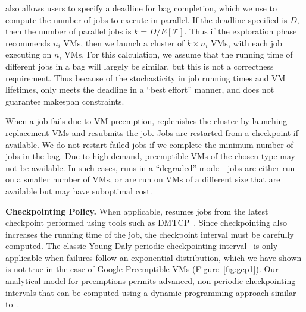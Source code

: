 \sysname also allows users to specify a deadline for bag completion, which we use to compute the number of jobs to execute in parallel.
If the deadline specified is $D$, then the number of parallel jobs is $k=D/E[\mathcal{T}]$.
Thus if the exploration phase recommends $n_i$ VMs, then we launch a cluster of $k\times n_i$ VMs, with each job executing on $n_i$ VMs. 
For this calculation, we assume that the running time of different jobs in a bag will largely be similar, but this is not a correctness requirement.
Thus because of the stochasticity in job running times and VM lifetimes, \sysname only meets the deadline in a ``best effort'' manner, and does not guarantee makespan constraints. 

When a job fails due to VM preemption, \sysname replenishes the cluster by launching replacement VMs and resubmits the job. 
Jobs are restarted from a checkpoint if available. 
We do not restart failed jobs if we complete the minimum number of jobs in the bag.
Due to high demand, preemptible VMs of the chosen type may not be available.
In such cases, \sysname runs in a ``degraded'' mode---jobs are either run on a smaller number of VMs, or are run on VMs of a different size that are available but may have suboptimal cost.  


\noindent \textbf{Checkpointing Policy.} When applicable, \sysname resumes jobs from the latest checkpoint performed using tools such as DMTCP~\cite{ansel2009dmtcp}.
Since checkpointing also increases the running time of the job, the checkpoint interval must be carefully computed. 
The classic Young-Daly periodic checkpointing interval~\cite{daly2006higher} is only applicable when failures follow an exponential distribution, which we have shown is not true in the case of Google Preemptible VMs (Figure~\ref{fig:gcp1}). 
Our analytical model for preemptions permits advanced, non-periodic checkpointing intervals that can be computed using a dynamic programming approach similar to~\cite{bougeret_checkpointing_2011}. 









